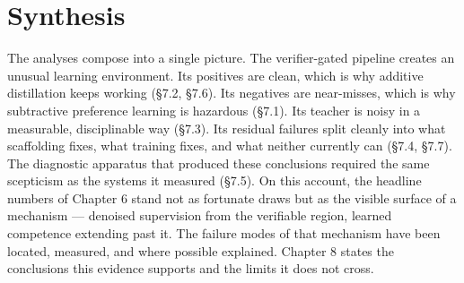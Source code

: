 \section{Synthesis}\label{sec:synthesis}

The analyses compose into a single picture. The verifier-gated pipeline creates an unusual learning environment. Its positives are clean, which is why additive distillation keeps working (\S7.2, \S7.6). Its negatives are near-misses, which is why subtractive preference learning is hazardous (\S7.1). Its teacher is noisy in a measurable, disciplinable way (\S7.3). Its residual failures split cleanly into what scaffolding fixes, what training fixes, and what neither currently can (\S7.4, \S7.7). The diagnostic apparatus that produced these conclusions required the same scepticism as the systems it measured (\S7.5). On this account, the headline numbers of Chapter 6 stand not as fortunate draws but as the visible surface of a mechanism --- denoised supervision from the verifiable region, learned competence extending past it. The failure modes of that mechanism have been located, measured, and where possible explained. Chapter 8 states the conclusions this evidence supports and the limits it does not cross.
